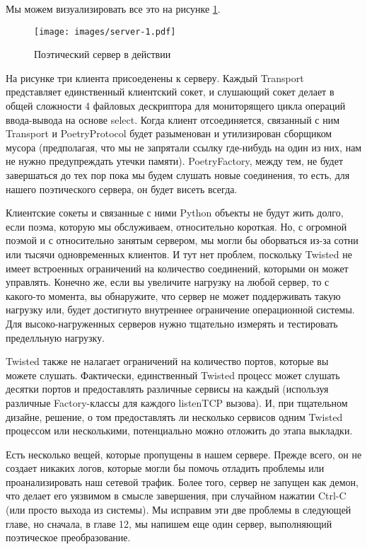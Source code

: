 Мы можем визуализировать все это на рисунке \ref{fig:server-1}.

\begin{figure}[h]
\begin{center}
    \texttt{[image: images/server-1.pdf]}
    \caption{Поэтический сервер в действии\label{fig:server-1}}
\end{center}
\end{figure}


На рисунке три клиента присоеденены к серверу. Каждый 
Transport представляет единственный клиентский сокет, и 
слушающий сокет делает в общей сложности 4 файловых дескриптора 
для мониторящего цикла операций ввода-вывода на  
основе select. Когда клиент отсоединяется, связанный с ним 
Transport и PoetryProtocol будет разыменован и утилизирован 
сборщиком мусора (предполагая, что мы не запрятали ссылку 
где-нибудь на один из них, нам не нужно 
предупреждать утечки памяти). PoetryFactory, между тем, не будет 
завершаться до тех пор пока мы будем слушать новые соединения, 
то есть, для нашего поэтического сервера, он будет висеть всегда. 


Клиентские сокеты и связанные с ними Python объекты не будут жить 
долго, если поэма, которую мы обслуживаем, относительно короткая. 
Но, с огромной поэмой и с относительно занятым сервером, мы могли 
бы оборваться из-за сотни или тысячи одновременных 
клиентов. И тут нет проблем, поскольку Twisted не имеет 
встроенных ограничений на количество соединений, которыми он 
может управлять. Конечно же, если вы увеличите нагрузку на 
любой сервер, то с какого-то момента, вы обнаружите, что 
сервер не может поддерживать такую нагрузку или, будет 
достигнуто внутреннее ограничение операционной системы. Для 
высоко-нагруженных серверов нужно тщательно измерять и тестировать пределльную нагрузку.


Twisted также не налагает ограничений на количество портов, 
которые вы можете слушать. Фактически, единственный Twisted процесс 
может слушать десятки портов и предоставлять различные сервисы на 
каждый (используя различные Factory-классы для каждого listenTCP вызова). 
И, при тщательном дизайне, решение, о том предоставлять ли несколько сервисов 
одним Twisted процессом или несколькими, 
потенциально можно отложить до этапа выкладки.


Есть несколько вещей, которые пропущены в нашем сервере. 
Прежде всего, он не создает никаких логов, которые 
могли бы помочь отладить проблемы или проанализировать 
наш сетевой трафик. Более того, сервер не запущен как 
демон, что делает его уязвимом в смысле завершения, 
при случайном нажатии Ctrl-C (или просто выхода из системы). 
Мы исправим эти две проблемы в следующей главе, но сначала, в 
главе 12, мы напишем еще один сервер, выполняющий 
поэтическое преобразование.


